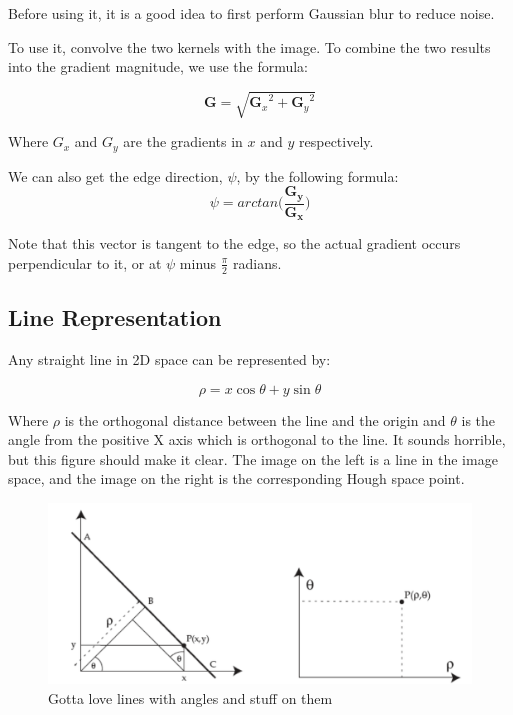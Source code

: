 \documentclass{article}
\begin{document}
        Before using it, it is a good idea to first perform Gaussian blur to reduce noise. 
        
        To use it, convolve the two kernels with the image. To combine the two results into the gradient magnitude, we use the formula:
        
        $$\mathbf{G} = \sqrt{ {\mathbf{G}_x}^2 + {\mathbf{G}_y}^2 }$$
        
        Where $G_x$ and $G_y$ are the gradients in $x$ and $y$ respectively.
    
    We can also get the edge direction, $\psi$, by the following formula:
    $$
        \psi = arctan\Big(\frac{\mathbf{G_{y}}}{\mathbf{G_{x}}}\Big)
    $$
    
    Note that this vector is tangent to the edge, so the actual gradient occurs perpendicular to it, or at $\psi$ minus $\frac{\pi}{2}$ radians.
    
    \subsection{Line Representation}
    Any straight line in 2D space can be represented by: 
    
    $$\rho = x \cos \theta+y\sin \theta$$
    
    Where $\rho$ is the orthogonal distance between the line and the origin and $\theta$ is the angle from the positive X axis which is orthogonal to the line. It sounds horrible, but this figure should make it clear. The image on the left is a line in the image space, and the image on the right is the corresponding Hough space point.
    
    \begin{figure}[h]
        \centering
        \includegraphics[scale=0.2]{images/linerep.png}
        \caption{Gotta love lines with angles and stuff on them}
    \end{figure}
    
\end{document}
